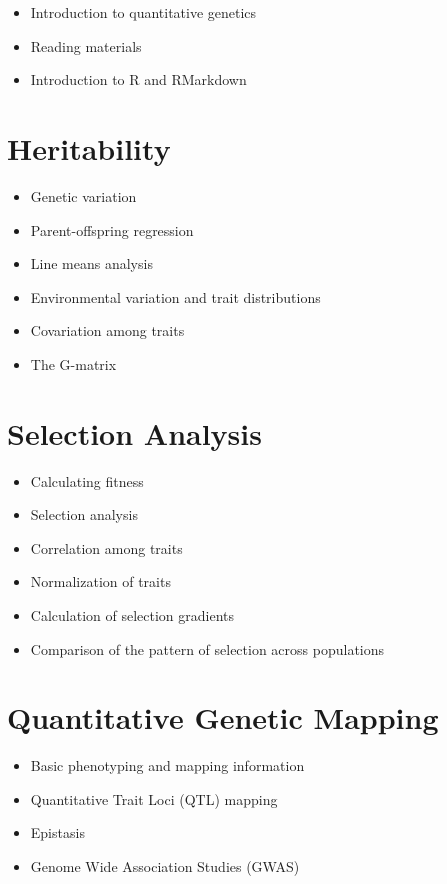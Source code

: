 \documentclass[]{book}
\providecommand{\tightlist}{%
  \setlength{\itemsep}{0pt}\setlength{\parskip}{0pt}}
\begin{document}
\begin{itemize}
\tightlist
\item
  Introduction to quantitative genetics
\item
  Reading materials
\item
  Introduction to R and RMarkdown
\end{itemize}

\hypertarget{heritability}{%
\section{Heritability}\label{heritability}}

\begin{itemize}
\tightlist
\item
  Genetic variation
\item
  Parent-offspring regression
\item
  Line means analysis
\item
  Environmental variation and trait distributions
\item
  Covariation among traits
\item
  The G-matrix
\end{itemize}

\hypertarget{selection-analysis}{%
\section{Selection Analysis}\label{selection-analysis}}

\begin{itemize}
\tightlist
\item
  Calculating fitness
\item
  Selection analysis
\item
  Correlation among traits
\item
  Normalization of traits
\item
  Calculation of selection gradients
\item
  Comparison of the pattern of selection across populations
\end{itemize}

\hypertarget{quantitative-genetic-mapping}{%
\section{Quantitative Genetic Mapping}\label{quantitative-genetic-mapping}}

\begin{itemize}
\tightlist
\item
  Basic phenotyping and mapping information
\item
  Quantitative Trait Loci (QTL) mapping
\item
  Epistasis
\item
  Genome Wide Association Studies (GWAS)
\end{itemize}
\end{document}

